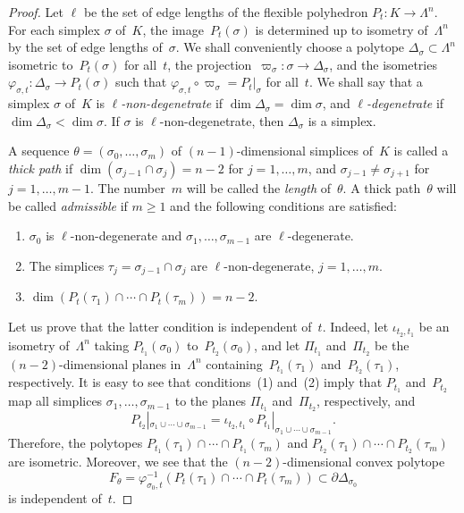 \documentclass[reqno,tbtags,12pt]{amsart}
\numberwithin{equation}{section}
\newcommand{\bell}{\boldsymbol{\ell}}
\theoremstyle{definition}
\begin{document}
\begin{proof}
Let $\bell$ be the set of edge lengths of the flexible polyhedron $P_t\colon K\to\Lambda^n$. For each simplex $\sigma$ of~$K$, the image~$P_t(\sigma)$ is  determined up to isometry of~$\Lambda^n$ by the set of edge lengths of~$\sigma$. We shall conveniently choose a polytope $ \Delta_{\sigma}\subset\Lambda^n$ isometric to~$P_t(\sigma)$ for all~$t$, the projection~$\varpi_{\sigma}\colon\sigma\to  \Delta_{\sigma}$, and the isometries  $\varphi_{\sigma,t}\colon  \Delta_{\sigma}\to P_t(\sigma)$ such that $\varphi_{\sigma,t}\circ\varpi_{\sigma}=P_t|_{\sigma}$ for all~$t$. 
We shall say that a simplex $\sigma$ of~$K$ is \textit{$\bell$-non-degenetrate\/} if $\dim  \Delta_{\sigma}=\dim\sigma$, and \textit{$\bell$-degenetrate\/} if $\dim  \Delta_{\sigma}<\dim\sigma$. If $\sigma$ is $\bell$-non-degenetrate, then $ \Delta_{\sigma}$ is a simplex.
 
A sequence $\theta=(\sigma_0,\ldots,\sigma_m)$  of $(n-1)$-dimensional simplices of~$K$ is called a \textit{thick path\/} if $\dim(\sigma_{j-1}\cap\sigma_j)=n-2$ for $j=1,\ldots,m$, and $\sigma_{j-1}\ne\sigma_{j+1}$ for $j=1,\ldots,m-1$. The number~$m$ will be called the \textit{length\/} of~$\theta$.
 A thick path~$\theta$ will be called \textit{admissible\/}  if $m\ge 1$ and the following conditions are satisfied:
\begin{enumerate}
\item $\sigma_0$  is $\bell$-non-degenerate and $\sigma_1,\ldots,\sigma_{m-1}$ are $\bell$-degenerate.
\item The simplices $\tau_j=\sigma_{j-1}\cap\sigma_j$ are $\bell$-non-degenerate, $j=1,\ldots,m$.
\item $\dim\left(P_t(\tau_1)\cap\cdots\cap P_t(\tau_m)\right)=n-2$.
\end{enumerate} 


 

Let us prove that the latter  condition is independent of~$t$. Indeed, let $\iota_{t_2,t_1}$ be an isometry of~$\Lambda^n$ taking $P_{t_1}(\sigma_0)$ to~$P_{t_2}(\sigma_0)$, and let $\Pi_{t_1}$ and~$\Pi_{t_2}$ be the $(n-2)$-dimensional planes in~$\Lambda^n$ containing~$P_{t_1}(\tau_1)$ and~$P_{t_2}(\tau_1)$, respectively. It is easy to see that conditions~(1) and~(2) imply that $P_{t_1}$  and~$P_{t_2}$ map all simplices $\sigma_1,\ldots,\sigma_{m-1}$ to the planes $\Pi_{t_1}$ and~$\Pi_{t_2}$, respectively, and $$P_{t_2}|_{\sigma_1\cup\cdots\cup\sigma_{m-1}}=\iota_{t_2,t_1}\circ P_{t_1}|_{\sigma_1\cup\cdots\cup\sigma_{m-1}}.$$ Therefore, the polytopes $P_{t_1}(\tau_1)\cap\cdots\cap P_{t_1}(\tau_m)$ and $P_{t_2}(\tau_1)\cap\cdots\cap P_{t_2}(\tau_m)$ are isometric. Moreover, we see that the $(n-2)$-dimensional convex polytope 
\begin{equation*}%
F_{\theta}=\varphi^{-1}_{\sigma_0,t}\left(P_t(\tau_1)\cap\cdots\cap P_t(\tau_m)\right)\subset\partial  \Delta_{\sigma_0}
\end{equation*}
is independent of~$t$. 




\end{proof}
\end{document}
